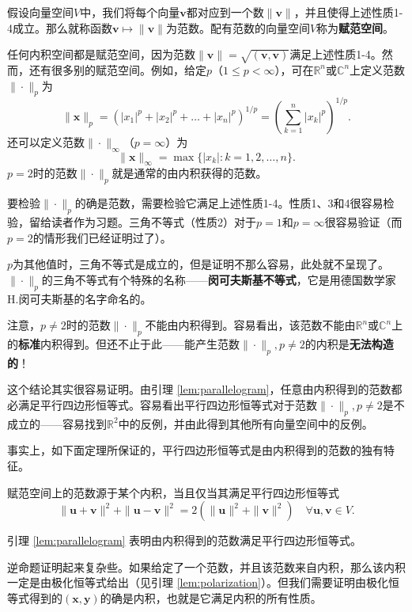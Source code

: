 假设向量空间$V$中，我们将每个向量$\mathbf{v}$都对应到一个数$\|\mathbf{v}\|$，并且使得上述性质1-4成立。那么就称函数$\mathbf{v}\mapsto\|\mathbf{v}\|$为范数。配有范数的向量空间$V$称为\textbf{赋范空间}。

任何内积空间都是赋范空间，因为范数$\|\mathbf{v}\|=\sqrt{(\mathbf{v},\mathbf{v})}$满足上述性质1-4。然而，还有很多别的赋范空间。例如，给定$p$（$1\le p<\infty$），可在$\mathbb{R}^n$或$\mathbb{C}^n$上定义范数$\|\cdot\|_p$为
\[\|\mathbf{x}\|_p=(|x_1|^p+|x_2|^p+\ldots+|x_n|^p)^{1/p}=\left(\sum_{k=1}^n|x_k|^p\right)^{1/p}.\]
还可以定义范数$\|\cdot\|_\infty$（$p=\infty$）为
\[\|\mathbf{x}\|_\infty=\max\{|x_k|:k=1,2,\ldots,n\}.\]
$p=2$时的范数$\|\cdot\|_p$就是通常的由内积获得的范数。

要检验$\|\cdot\|_p$的确是范数，需要检验它满足上述性质1-4。性质1、3和4很容易检验，留给读者作为习题。三角不等式（性质2）对于$p=1$和$p=\infty$很容易验证（而$p=2$的情形我们已经证明过了）。

$p$为其他值时，三角不等式是成立的，但是证明不那么容易，此处就不呈现了。$\|\cdot\|_p$的三角不等式有个特殊的名称——{\bf 闵可夫斯基不等式}，它是用德国数学家H.闵可夫斯基的名字命名的。

注意，$p\ne 2$时的范数$\|\cdot\|_p$不能由内积得到。容易看出，该范数不能由$\mathbb{R}^n$或$\mathbb{C}^n$上的\textbf{标准}内积得到。但还不止于此——能产生范数$\|\cdot\|_p,p\ne 2$的内积是\textbf{无法构造的}！

这个结论其实很容易证明。由引理 \ref{lem:parallelogram}，任意由内积得到的范数都必满足平行四边形恒等式。容易看出平行四边形恒等式对于范数\linebreak $\|\cdot\|_p,p\ne 2$是不成立的——容易找到$\mathbb{R}^2$中的反例，并由此得到其他所有向量空间中的反例。

事实上，如下面定理所保证的，平行四边形恒等式是由内积得到的范数的独有特征。
\begin{theorem}
    赋范空间上的范数源于某个内积，当且仅当其满足平行四边形恒等式
    \[\|\mathbf{u}+\mathbf{v}\|^2+\|\mathbf{u}-\mathbf{v}\|^2=2(\|\mathbf{u}\|^2+\|\mathbf{v}\|^2)\quad\forall\mathbf{u},\mathbf{v}\in V.\]
\end{theorem}

引理 \ref{lem:parallelogram} 表明由内积得到的范数满足平行四边形恒等式。

逆命题证明起来复杂些。如果给定了一个范数，并且该范数来自内积，那么该内积一定是由极化恒等式给出（见引理 \ref{lem:polarization}）。但我们需要证明由极化恒等式得到的$(\mathbf{x},\mathbf{y})$的确是内积，也就是它满足内积的所有性质。


